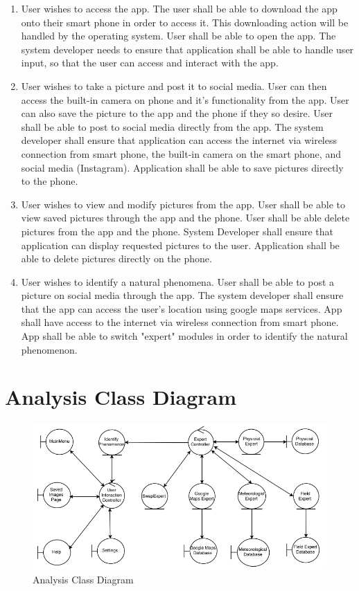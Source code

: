 \documentclass[]{article}
\begin{document}
\begin{enumerate}
	\item User wishes to access the app.  The user shall be able to download the app onto their smart phone in order to access it.  This downloading action will be handled by the operating system.  User shall be able to open the app.  The system developer needs to ensure that application shall be able to handle user input, so that the user can access and interact with the app.
	\item User wishes to take a picture and post it to social media.  User can then access the built-in camera on phone and it's functionality from the app.  User can also save the picture to the app and the phone if they so desire.  User shall be able to post to social media directly from the app.  The system developer shall ensure that application can access the internet via wireless connection from smart phone, the built-in camera on the smart phone, and social media (Instagram).  Application shall be able to save pictures directly to the phone.
	\item User wishes to view and modify pictures from the app.  User shall be able to view saved pictures through the app and the phone.  User shall be able delete pictures from the app and the phone.  System Developer shall ensure that application can display requested pictures to the user.  Application shall be able to delete pictures directly on the phone.
	\item User wishes to identify a natural phenomena. User shall be able to post a picture on social media through the app.  The system developer shall ensure that the app can access the user's location using google maps services. App shall have access to the internet via wireless connection from smart phone. App shall be able to switch "expert" modules in order to identify the natural phenomenon. 
\end{enumerate}

\section{Analysis Class Diagram}
\begin{figure}
	\includegraphics[width=\linewidth]{AnalysisClassDiagram.png}
	\caption{Analysis Class Diagram}
\end{figure}
\end{document}
